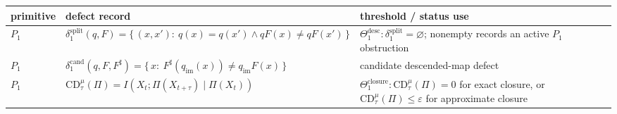 \documentclass[11pt]{article}
\theoremstyle{definition}
\begin{document}
\begin{longtable}[]{@{}lll@{}}
\toprule
\begin{minipage}[b]{0.30\columnwidth}\raggedright
primitive\strut
\end{minipage} & \begin{minipage}[b]{0.30\columnwidth}\raggedright
defect record\strut
\end{minipage} & \begin{minipage}[b]{0.30\columnwidth}\raggedright
threshold / status use\strut
\end{minipage}\tabularnewline
\midrule
\endhead
\begin{minipage}[t]{0.30\columnwidth}\raggedright
\(P_1\)\strut
\end{minipage} & \begin{minipage}[t]{0.30\columnwidth}\raggedright
\(\delta_1^{\mathrm{split}}(q,F)=\{\,(x,x'):\ q(x)=q(x')\wedge qF(x)\neq qF(x')\,\}\)\strut
\end{minipage} & \begin{minipage}[t]{0.30\columnwidth}\raggedright
\(\Theta_1^{\mathrm{desc}}:\delta_1^{\mathrm{split}}=\varnothing\); nonempty records an active \(P_1\) obstruction\strut
\end{minipage}\tabularnewline
\begin{minipage}[t]{0.30\columnwidth}\raggedright
\(P_1\)\strut
\end{minipage} & \begin{minipage}[t]{0.30\columnwidth}\raggedright
\(\delta_1^{\mathrm{cand}}(q,F,F^\sharp)=\{\,x:\ F^\sharp(q_{\mathrm{im}}(x))\neq q_{\mathrm{im}}F(x)\,\}\)\strut
\end{minipage} & \begin{minipage}[t]{0.30\columnwidth}\raggedright
candidate descended-map defect\strut
\end{minipage}\tabularnewline
\begin{minipage}[t]{0.30\columnwidth}\raggedright
\(P_1\)\strut
\end{minipage} & \begin{minipage}[t]{0.30\columnwidth}\raggedright
\(\mathrm{CD}_{\tau}^{\mu}(\Pi)=I(X_t;\Pi(X_{t+\tau})\mid\Pi(X_t))\)\strut
\end{minipage} & \begin{minipage}[t]{0.30\columnwidth}\raggedright
\(\Theta_1^{\mathrm{closure}}:\mathrm{CD}_{\tau}^{\mu}(\Pi)=0\) for exact closure, or \(\mathrm{CD}_{\tau}^{\mu}(\Pi)\le\varepsilon\) for approximate closure\strut
\end{minipage}\tabularnewline

\end{longtable}
\end{document}

